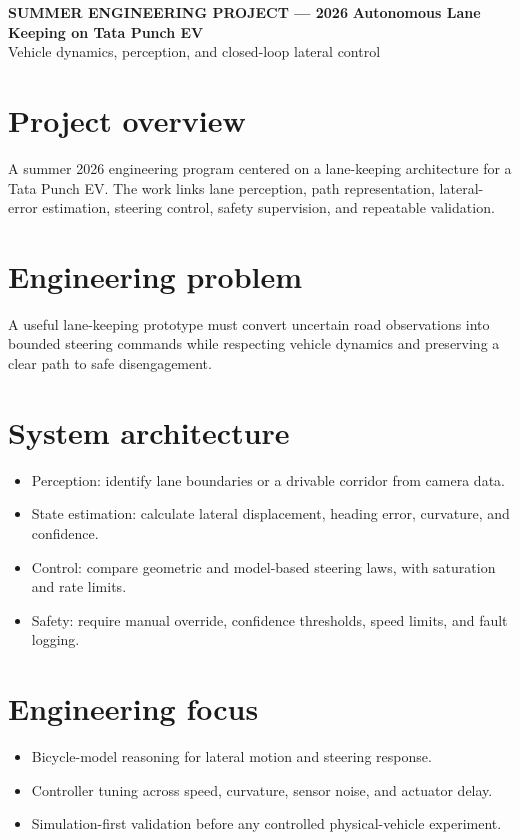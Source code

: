 \documentclass[10pt]{article}
\begin{document}
{\color{blue}\small\bfseries SUMMER ENGINEERING PROJECT --- 2026}
\vspace{0.4em}
{\color{navy}\LARGE\bfseries Autonomous Lane Keeping on Tata Punch EV}\\
{\color{muted}\large Vehicle dynamics, perception, and closed-loop lateral control}

\section*{Project overview}
A summer 2026 engineering program centered on a lane-keeping architecture for a Tata Punch EV. The work links lane perception, path representation, lateral-error estimation, steering control, safety supervision, and repeatable validation.

\section*{Engineering problem}
A useful lane-keeping prototype must convert uncertain road observations into bounded steering commands while respecting vehicle dynamics and preserving a clear path to safe disengagement.

\section*{System architecture}
\begin{itemize}
\item Perception: identify lane boundaries or a drivable corridor from camera data.
\item State estimation: calculate lateral displacement, heading error, curvature, and confidence.
\item Control: compare geometric and model-based steering laws, with saturation and rate limits.
\item Safety: require manual override, confidence thresholds, speed limits, and fault logging.
\end{itemize}

\section*{Engineering focus}
\begin{itemize}
\item Bicycle-model reasoning for lateral motion and steering response.
\item Controller tuning across speed, curvature, sensor noise, and actuator delay.
\item Simulation-first validation before any controlled physical-vehicle experiment.
\end{itemize}
\end{document}
